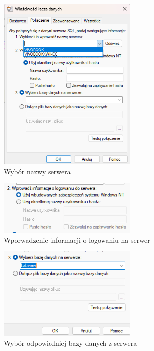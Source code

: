 \documentclass{report}
\begin{document}
\begin{figure}[H]
    \centering
    \includegraphics[width=0.6\textwidth]{src/Database/Stage3.png}
    \caption{Wybór nazwy serwera}
    \label{fig:first-att}
\end{figure}

\begin{figure}[H]
    \centering
    \includegraphics[width=0.6\textwidth]{src/Database/Stage4.png}
    \caption{Wporwadzenie informacji o logowaniu na serwer}
    \label{fig:first-att}
\end{figure}

\begin{figure}[H]
    \centering
    \includegraphics[width=0.6\textwidth]{src/Database/Stage5.png}
    \caption{Wybór odpowiedniej bazy danych z serwera}
    \label{fig:first-att}
\end{figure}
\end{document}
